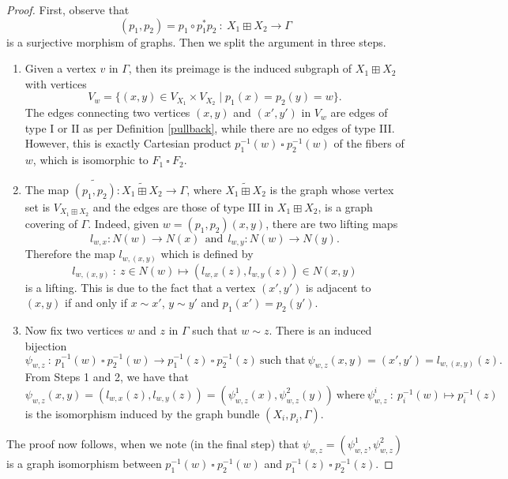 \documentclass{amsart}
\theoremstyle{definition}
\numberwithin{equation}{section}
\begin{document}
\begin{proof}
First, observe that \begin{equation} (p_1, p_2) = p_1 \circ p_1^* p_2 \ :  \ X_1 \boxplus X_2 \longrightarrow \Gamma \end{equation} is a surjective morphism of graphs. Then we split the argument in three steps.
\begin{enumerate}
    \item[Step 1.] Given a vertex $v$ in $\Gamma$, then its preimage is the induced subgraph of $X_1 \boxplus X_2$ with vertices 
    \begin{equation}
        V_w = \{(x,y) \in V_{X_1} \times V_{X_2} \mid p_1(x) = p_2(y) = w\}.
    \end{equation}
    The edges connecting two vertices $(x,y)$ and $(x', y')$ in $V_w$ are edges of type I or  II as per Definition \ref{pullback},  while there are no edges of type III. However, this is exactly Cartesian product $p_1^{-1}(w)  \ \square  \ p_2^{-1}(w)$ of the fibers of $w$, which is  isomorphic to $F_1  \ \square  \ F_2$.
    \item[Step 2.] The map $\widetilde{(p_1,p_2)}: \widetilde{X_1 \boxplus X_2} \longrightarrow \Gamma$, where $\widetilde{X_1 \boxplus X_2}$ is the graph whose vertex set is $V_{X_1 \boxplus X_2}$ and the edges are those of type III in $X_1 \boxplus X_2$, is a graph covering of $\Gamma$. 
    Indeed, given $w= (p_1,p_2)(x,y)$, there are two lifting maps \begin{equation}l_{w,x}: N(w) \longrightarrow N(x) \ \  \mbox{and} \ \ l_{w,y}: N(w) \longrightarrow N(y).\end{equation} Therefore the map $l_{w,(x,y)}$ which is defined by
\begin{equation}l_{w,(x,y)} \ : \ z\in N(w)  \longmapsto (l_{w,x}(z), l_{w,y}(z)) \in N(x,y) \end{equation}
     is a lifting. This is due to the fact that a vertex $(x',y')$ is adjacent to $(x,y)$ if and only if $x \sim x'$, $y \sim y'$ and $p_1(x')=p_2(y')$.
\item[Step 3.] Now fix two vertices $w$ and $z$ in $\Gamma$ such that $w \sim z$. There is an induced bijection \begin{equation}\psi_{w,z} \ :  \ p_1^{-1}(w)  \ \square  \ p_2^{-1}(w) \longrightarrow  p_1^{-1}(z)  \ \square  \ p_2^{-1}(z) \ \mbox{such that}  \ \psi_{w,z}(x,y) = (x',y') = l_{w, (x,y)}(z).\end{equation} From Steps 1 and 2, we have that  
\begin{equation}\label{couple}
\psi_{w,z}(x,y) = (l_{w,x}(z), l_{w,y}(z)) = (\psi^1_{w,z}(x), \psi^2_{w,z}(y)) \ \mbox{where} \ \psi^i_{w,z} \ : \  p_i^{-1}(w) \longmapsto p_i^{-1}(z)
\end{equation}
is the isomorphism induced by the graph bundle $(X_i, p_i, \Gamma)$. 
\end{enumerate}
The proof now follows, when we note  (in the final step) that $\psi_{w,z} = (\psi^1_{w,z}, \psi^2_{w,z})$ is a graph isomorphism between $p_1^{-1}(w)  \ \square \  p_2^{-1}(w) $ and $p_1^{-1}(z)  \ \square  \ p_2^{-1}(z)$. \end{proof}
\end{document}
